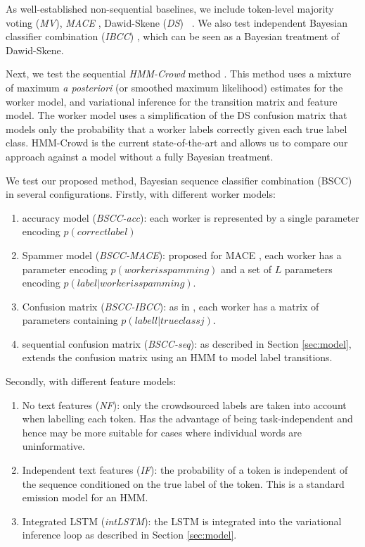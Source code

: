 As well-established non-sequential baselines, we include token-level majority voting (\emph{MV}), \emph{MACE} \cite{hovy2013learning}, Dawid-Skene (\emph{DS}) ~\cite{dawid_maximum_1979}.  We also test independent Bayesian classifier combination (\emph{IBCC}) \cite{kim2012bayesian,simpson_long_paper}, which can be seen as a Bayesian treatment of Dawid-Skene. 

Next, we test the sequential \emph{HMM-Crowd} method \cite{nguyen2017aggregating}. This method uses a mixture of maximum \emph{a posteriori} (or smoothed maximum likelihood) estimates for the worker model, and variational inference for the transition matrix and feature model. The worker model uses a simplification of the DS confusion matrix that models only the probability that a worker labels correctly given each true label class. HMM-Crowd is the current state-of-the-art and allows us to compare our approach against a model without a fully Bayesian treatment. 

We test our proposed method, Bayesian sequence classifier combination (BSCC) in several configurations. Firstly, with different worker models:
\begin{enumerate}
\item accuracy model (\emph{BSCC-acc}): each worker is represented by a single parameter encoding $p( correct label )$
\item Spammer model (\emph{BSCC-MACE}): proposed for MACE \cite{hovy2013learning}, each worker has a parameter encoding 
$p( worker is spamming )$ and a set of $L$ parameters encoding $p( label | worker is spamming)$.
\item Confusion matrix (\emph{BSCC-IBCC}): as in \cite{simpsonlong}, each worker has a matrix of parameters containing $p( label l | true class j)$.
\item sequential confusion matrix (\emph{BSCC-seq}): as described in Section \ref{sec:model}, extends the confusion matrix using an HMM to model label transitions.
\end{enumerate}
Secondly, with different feature models:
\begin{enumerate}
\item No text features (\emph{NF}): only the crowdsourced labels are taken into account when labelling each token. Has the advantage of being task-independent and hence may be more suitable for cases where individual words are uninformative.
\item Independent text features (\emph{IF}): the probability of a token is independent of the sequence conditioned on the true label of the token. This is a standard emission model for an HMM.
\item Integrated LSTM (\emph{intLSTM}): the LSTM is integrated into the variational inference loop as described in Section \ref{sec:model}.
\end{enumerate}


